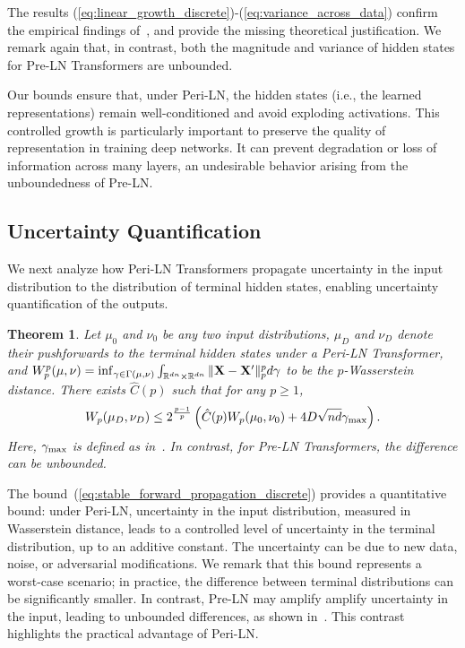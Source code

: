 \documentclass[journal]{IEEEtran}
\def\eqref#1{equation~\ref{#1}}
\newcommand{\bfX}{{\bf X}}
\renewcommand{\eqref}[1]{(\ref{#1})}
\theoremstyle{plain}
\newtheorem{theorem}{Theorem}
\theoremstyle{definition}
\theoremstyle{remark}
\begin{document}
The results \eqref{eq:linear_growth_discrete}-\eqref{eq:variance_across_data} confirm the empirical findings of~\cite{kim2025peri}, and provide the missing theoretical justification. We remark again that, in contrast, both the magnitude and variance of hidden states for Pre-LN Transformers are unbounded. 

Our bounds ensure that, under Peri-LN, the hidden states (i.e., the learned representations) remain well-conditioned and avoid exploding activations. This controlled growth is particularly important to preserve the quality of representation in training deep networks. It can prevent degradation or loss of information across many layers, an undesirable behavior arising from the unboundedness of Pre-LN.

\subsection{Uncertainty Quantification} 
We next analyze how Peri-LN Transformers propagate uncertainty in the input distribution to the distribution of terminal hidden states, enabling uncertainty quantification of the outputs.

\begin{theorem}\label{thm:uq}
    Let $\mu_0$ and $\nu_0$ be any two input distributions, $\mu_D$ and $\nu_D$ denote their pushforwards to the terminal hidden states under a Peri-LN Transformer, and $W^p_p(\mu,\nu) = \inf_{\gamma \in \Gamma(\mu,\nu)} \int_{\mathbb{R}^{dn} \times \mathbb{R}^{dn}} \|\bfX-\bfX'\|_p^p d\gamma $ to be the $p$-Wasserstein distance. There exists $\hat{C}(p)$ such that for any $p \geq 1$,
    \begin{equation}\label{eq:stable_forward_propagation_discrete}
        W_p(\mu_D,\nu_D) \leq 2^{\frac{p-1}{p}} \left( \hat{C}(p)W_p(\mu_0,\nu_0) +4 D \sqrt{nd}   \gamma_{\rm max}\right).
    \end{equation}
    Here, $ \gamma_{\rm max}$ is defined as in~. In contrast, for Pre-LN Transformers, the difference can be unbounded.
\end{theorem}

The bound~\eqref{eq:stable_forward_propagation_discrete} provides a quantitative bound: under Peri-LN, uncertainty in the input distribution, measured in Wasserstein distance, leads to a controlled level of uncertainty in the terminal distribution, up to an additive constant. The uncertainty can be due to new data, noise, or adversarial modifications. We remark that this bound represents a worst-case scenario; in practice, the difference between terminal distributions can be significantly smaller.
In contrast, Pre-LN may amplify amplify uncertainty in the input, leading to unbounded differences, as shown in~. This contrast highlights the practical advantage of Peri-LN. 
\end{document}

